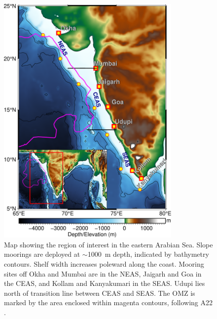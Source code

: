 \documentclass[authoryear,review,11pt]{elsarticle}
\begin{document}
\newpage
\begin{figure}[htbp]
	\centering
	\includegraphics[width=0.8\textwidth]{./figures/map.pdf} 
	\captionsetup{justification=justified,font=footnotesize,skip=0.05\baselineskip,width=0.8\textwidth}
	\caption{Map showing the region of interest in the eastern Arabian Sea. Slope moorings are deployed at $\sim$1000~m depth, indicated by bathymetry contours. Shelf width increases poleward along the coast. Mooring sites off Okha and Mumbai are in the NEAS, Jaigarh and Goa in the CEAS, and Kollam and Kanyakumari in the SEAS. Udupi lies north of transition line between CEAS and SEAS. The OMZ is marked by the area enclosed within magenta contours, following A22 \citep{naqvi1990seasonal, smith2005mesozooplankton}.}
	\label{fig:map}
\end{figure}
\end{document}
